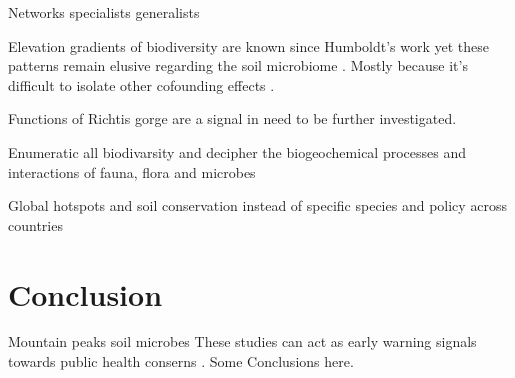\documentclass[unnumsec,webpdf,contemporary,large]{oup-authoring-template}%
\theoremstyle{thmstyleone}%
\theoremstyle{thmstyletwo}%
\theoremstyle{thmstylethree}%
\begin{document}
Networks specialists generalists \citep{Barberan2012}

Elevation gradients of biodiversity are known since Humboldt's work \citep{Rahbek2019} 
yet these patterns remain elusive regarding the soil microbiome \citep{Looby2020, Siles2023}.
Mostly because it's difficult to isolate other cofounding effects \citep{Nottingham2018}. 

Functions of Richtis gorge are a signal in need to be further investigated.

Enumeratic all biodivarsity \citep{Anthony2023} and decipher the biogeochemical 
processes and interactions of fauna, flora and microbes \citep{Fry2019, Crowther2019,GRANDY201640,Delgado-Baquerizo2020}

Global hotspots \citep{Guerra2022}
and soil conservation instead of specific species \citep{Guerra2021}
and policy \citep{KONINGER2022} across countries \citep{Putten2023}


\section{Conclusion}

Mountain peaks soil microbes \citep{Adamczyk2019}
These studies can act as early warning signals towards public health conserns \citep{Banerjee2023}.
Some Conclusions here.


%
%
%
%
%
%
\end{document}
